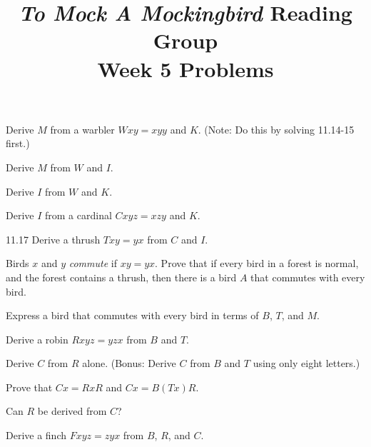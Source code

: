 \documentclass[12pt, letterpaper]{article}
\title{\emph{To Mock A Mockingbird} Reading Group\\Week 5 Problems}
\begin{document}
\maketitle

\begin{prob}{11.13 }
Derive $M$ from a warbler $Wxy = xyy$ and $K$. (Note: Do this by solving 11.14-15 first.)
\end{prob}

\begin{prob}{11.14}
Derive $M$ from $W$ and $I$.
\end{prob}

\begin{prob}{11.15}
Derive $I$ from $W$ and $K$.
\end{prob}

\begin{prob}{11.16}
Derive $I$ from a cardinal $Cxyz = xzy$ and $K$.
\end{prob}

\begin{prob} 11.17  
Derive a thrush $Txy = yx$ from $C$ and $I$.
\end{prob}

\begin{prob}{11.18}
Birds $x$ and $y$ \emph{commute} if $xy = yx$. Prove that if every bird in a forest is normal, and the forest contains a thrush, then there is a bird $A$ that commutes with every bird.
\end{prob}

\begin{prob}{11.19}
Express a bird that commutes with every bird in terms of $B$, $T$, and $M$.
\end{prob}

\begin{prob}{11.20}
Derive a robin $Rxyz = yzx$ from $B$ and $T$.
\end{prob}

\begin{prob}{11.21}
Derive $C$ from $R$ alone. (Bonus: Derive $C$ from $B$ and $T$ using only eight letters.)
\end{prob}

\begin{prob}{11.22}
Prove that $Cx = RxR$ and $Cx = B(Tx)R$.
\end{prob}

\begin{prob}{11.23}
Can $R$ be derived from $C$?
\end{prob}

\begin{prob}{11.24}
Derive a finch $Fxyz = zyx$ from $B$, $R$, and $C$.
\end{prob}
\end{document}
